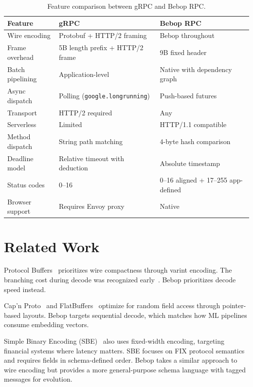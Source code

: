 \documentclass[10pt,onecolumn]{article}
\begin{document}
\begin{table}[H]
\centering
\small
\begin{tabular}{@{}lll@{}}
\toprule
\textbf{Feature} & \textbf{gRPC} & \textbf{Bebop RPC} \\
\midrule
Wire encoding & Protobuf + HTTP/2 framing & Bebop throughout \\
Frame overhead & 5B length prefix + HTTP/2 frame & 9B fixed header \\
Batch pipelining & Application-level & Native with dependency graph \\
Async dispatch & Polling (\texttt{google.longrunning}) & Push-based futures \\
Transport & HTTP/2 required & Any \\
Serverless & Limited & HTTP/1.1 compatible \\
Method dispatch & String path matching & 4-byte hash comparison \\
Deadline model & Relative timeout with deduction & Absolute timestamp \\
Status codes & 0--16 & 0--16 aligned + 17--255 app-defined \\
Browser support & Requires Envoy proxy & Native \\
\bottomrule
\end{tabular}
\caption{Feature comparison between gRPC and Bebop RPC.}
\label{tab:rpc-comparison}
\end{table}


\section{Related Work}

Protocol Buffers~\cite{protobuf} prioritizes wire compactness through varint encoding. The branching cost during decode was recognized early~\cite{varda-hn}. Bebop prioritizes decode speed instead.

Cap'n Proto~\cite{capnproto} and FlatBuffers~\cite{flatbuffers} optimize for random field access through pointer-based layouts. Bebop targets sequential decode, which matches how ML pipelines consume embedding vectors.

Simple Binary Encoding (SBE)~\cite{sbe} also uses fixed-width encoding, targeting financial systems where latency matters. SBE focuses on FIX protocol semantics and requires fields in schema-defined order. Bebop takes a similar approach to wire encoding but provides a more general-purpose schema language with tagged messages for evolution.
\end{document}
